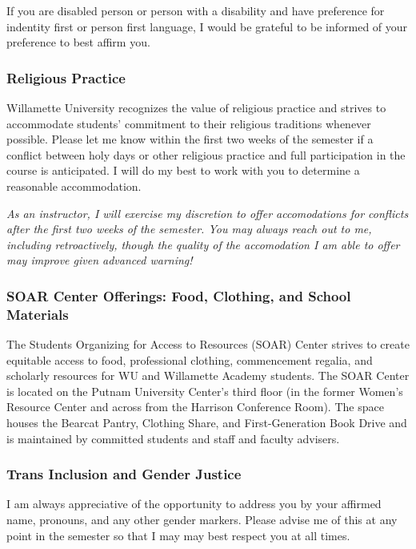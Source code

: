 If you are disabled person or person with a disability and have preference for indentity first or person first language, I would be grateful to be informed of your preference to best affirm you.

\subsubsection*{Religious Practice}

Willamette University recognizes the value of religious practice and strives to accommodate students’ commitment to their religious traditions whenever possible. Please let me know within the first two weeks of the semester if a conflict between holy days or other religious practice and full participation in the course is anticipated. I will do my best to work with you to determine a reasonable accommodation.

\textit{As an instructor, I will exercise my discretion to offer accomodations for conflicts after the first two weeks of the semester. You may always reach out to me, including retroactively, though the quality of the accomodation I am able to offer may improve given advanced warning!}

\subsubsection*{SOAR Center Offerings: Food, Clothing, and School Materials}

The Students Organizing for Access to Resources (SOAR) Center strives to create equitable access to food, professional clothing, commencement regalia, and scholarly resources for WU and Willamette Academy students. The SOAR Center is located on the Putnam University Center's third floor (in the former Women's Resource Center and across from the Harrison Conference Room). The space houses the Bearcat Pantry, Clothing Share, and First-Generation Book Drive and is maintained by committed students and staff and faculty advisers.

\subsubsection*{Trans Inclusion and Gender Justice}

I am always appreciative of the opportunity to address you by your affirmed name, pronouns, and any other gender markers. Please advise me of this at any point in the semester so that I may may best respect you at all times.

